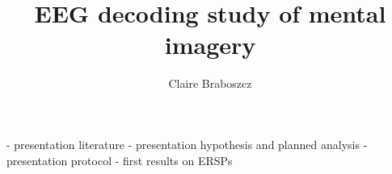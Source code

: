 \documentclass{beamer} %
\title {EEG decoding study of mental imagery }
\author{Claire Braboszcz}
\date{}
\begin{document}
\frame
{\titlepage
		

- presentation literature 
- presentation hypothesis and planned analysis
- presentation protocol
- first results on ERSPs



}

\frame{\tableofcontents[sections={1-4}]}

%







\end{document}
